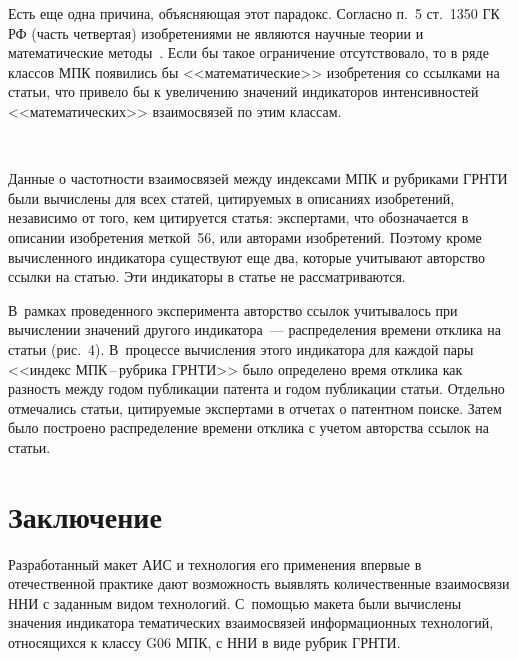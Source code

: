 \begin{multicols}{2}
     Есть еще одна причина, объясняющая этот парадокс. Согласно п.~5 ст.~1350 ГК РФ (часть четвертая)
изобретениями не являются научные теории и математические методы~\cite{17-zat}. Если бы такое ограничение
отсутствовало, то в ряде классов МПК появились бы <<математические>> изобретения со ссылками на статьи, что
привело бы к увеличению значений индикаторов интенсивностей
<<математических>> взаимосвязей по этим классам.

\begin{figure*}[b] %
\vspace*{1pt}
\begin{center}
\mbox{%
\epsfxsize=120.51mm
}
\end{center}
\vspace*{-9pt}
      \end{figure*}


     Данные о частотности взаимосвязей между индексами МПК и рубриками ГРНТИ были
     вы\-чис\-ле\-ны для всех
статей, цитируемых в описаниях изобретений, независимо от того, кем цитируется статья: экспертами, что обозначается
в описании изобретения меткой~56, или авторами изобретений. Поэтому кроме вычисленного индикатора существуют
еще два, которые учитывают авторство ссылки на статью. Эти индикаторы в статье не рас\-смат\-ри\-ва\-ются.

В~рамках проведенного эксперимента авторство ссылок
учитывалось при вычислении значений другого индикатора~--- распределения времени отклика на статьи (рис.~4).
В~процессе вычисления этого индикатора для каждой пары <<индекс МПК\,--\,руб\-ри\-ка ГРНТИ>> было определено
время отклика как разность между годом публикации патента и годом публикации статьи. Отдельно отмечались статьи,
цитируемые экспертами в отчетах о патентном поиске. Затем было построено распределение времени отклика с учетом
авторства ссылок на статьи.

\vspace*{-6pt}

\section{Заключение}

     Разработанный макет АИС и технология его применения впервые в
     отечественной практике \mbox{дают} возможность
выявлять количественные взаимосвязи ННИ с заданным видом технологий. С~по\-мощью макета были вычислены
значения индикатора тематических взаимосвязей информационных технологий, относящихся к классу G06 МПК, с ННИ
в виде рубрик ГРНТИ.



\end{multicols}

